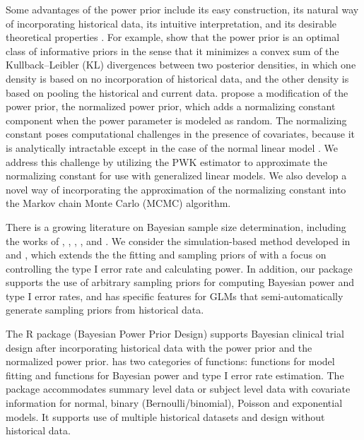Some advantages of the power prior include its easy construction, its natural way of incorporating historical data, its intuitive interpretation, and its desirable theoretical properties \citep{ibrahim_2015}. For example,  \cite{ibrahim_2003} show that the power prior is an optimal class of informative priors in the sense that it minimizes a convex sum of the Kullback–Leibler (KL) divergences between two posterior densities, in which one density is based on no incorporation of historical data, and the other density is based on pooling the historical and current data. \cite{duan_2006} propose a modification of the power prior, the normalized power prior, which adds a normalizing constant component when the power parameter is modeled as random. The normalizing constant poses computational challenges in the presence of covariates, because it is analytically intractable except in the case of the normal linear model \citep{Carvalho_Ibrahim_2021}. We address this challenge by utilizing the PWK estimator \citep{pwk_2018} to approximate the normalizing constant for use with generalized linear models. We also develop a novel way of incorporating the approximation of the normalizing constant into the Markov chain Monte Carlo (MCMC) algorithm. 

There is a growing literature on Bayesian sample size determination, including the works of \cite{Rahme_1998}, \cite{Simon_1999}, \cite{Gelfand_2002}, \cite{DeSantis_2007}, \cite{MLan_2006} and \cite{MLan_2008}. We consider the simulation-based method developed in \cite{Chen_2011} and \cite{Psioda_Ibrahim_2019}, which extends the the fitting and sampling priors of \cite{Gelfand_2002} with a focus on controlling the type I error rate and calculating power. In addition, our package supports the use of arbitrary sampling priors for computing Bayesian power and type I error rates, and has specific features for GLMs that semi-automatically generate sampling priors from historical data.

The R package  (Bayesian Power Prior Design) \citep{BayesPPD} supports Bayesian clinical trial design after incorporating historical data with the power prior and the normalized power prior.  has two categories of functions: functions for model fitting and functions for Bayesian power and type I error rate estimation. The package accommodates summary level data or subject level data with covariate information for normal, binary (Bernoulli/binomial), Poisson and exponential models. It supports use of multiple historical datasets and design without historical data. 

